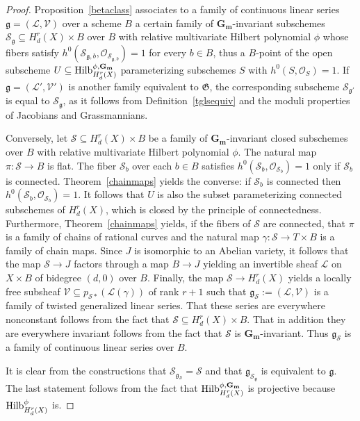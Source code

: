 \documentclass[a4paper,11pt]{amsart}
\theoremstyle{plain}
\theoremstyle{definition}
\theoremstyle{remark}
\def\cc{{\mathbf G}_{\mathbf m}}
\def\L{\mathcal{L}}
\def\V{\mathcal{V}}
\def\:{\colon}
\begin{document}
\begin{proof} Proposition~\ref{betaclass} associates to a family of continuous linear series $\mathfrak g=(\L,\V)$ over a scheme $B$ a certain family of $\cc$-invariant subschemes $\mathcal S_{\mathfrak g}\subseteq H^r_d(X)\times B$ over $B$ with relative multivariate Hilbert polynomial $\phi$ 
whose fibers satisfy $h^0(\mathcal S_{\mathfrak g,b},\mathcal O_{\mathcal S_{\mathfrak g,b}})=1$ for every $b\in B$, thus a 
$B$-point of the open subscheme $U\subseteq\text{\rm Hilb}_{H_d^r(X)}^{\phi,\cc}$ parameterizing subschemes $S$ with $h^0(S,\mathcal O_S)=1$. If $\mathfrak g=(\L',\V')$ is another family equivalent to $\mathfrak G$, the corresponding subscheme $\mathcal S_{\mathfrak g'}$ is equal to $\mathcal S_{\mathfrak g}$, as it follows from Definition~\ref{tglsequiv} and the moduli properties of Jacobians and Grassmannians. 

Conversely, let $\mathcal S\subseteq H_d^r(X)\times B$ be a family of 
$\cc$-invariant closed subschemes over $B$ with relative multivariate Hilbert polynomial $\phi$. The natural map $\pi\colon\mathcal S\to B$ is flat. The fiber $\mathcal S_b$ over each $b\in B$ satisfies $h^0(\mathcal S_b,\mathcal O_{\mathcal S_b})=1$ only if $\mathcal S_b$ is connected. Theorem~\ref{chainmaps} yields the converse: if $\mathcal S_b$ is connected then $h^0(\mathcal S_b,\mathcal O_{\mathcal S_b})=1$. It follows that 
$U$ is also the subset parameterizing connected subschemes of $H_d^r(X)$, which is closed by the principle of connectedness. Furthermore, Theorem~\ref{chainmaps} yields, if the fibers of 
$\mathcal S$ are connected, that $\pi$ is a family of chains of rational curves and the natural map 
$\gamma\:\mathcal S\to T\times B$ is a family of chain maps. Since 
$J$ is isomorphic to an Abelian variety, it follows that the map $\mathcal S\to J$ factors through a map $B\to J$ yielding an invertible sheaf $\mathcal L$ on $X\times B$ of bidegree $(d,0)$ over $B$. Finally, the map $\mathcal S\to H^r_d(X)$ yields a locally free subsheaf 
$\V\subseteq p_{\mathcal S*}(\mathcal L(\gamma))$ of rank $r+1$ such that $\mathfrak g_{\mathcal S}:=(\L,\V)$ is a family of twisted generalized linear series. That these series are everywhere nonconstant follows from the fact that $\mathcal S\subseteq H_d^r(X)\times B$. That in addition they are everywhere invariant follows from the fact that $\mathcal S$ is $\cc$-invariant. Thus $\mathfrak g_{\mathcal S}$ is a family of continuous linear series over $B$. 

It is clear from the constructions that $\mathcal S_{\mathfrak g_{\mathcal S}}=\mathcal S$ and that $\mathfrak g_{\mathcal S_{\mathfrak g}}$ is equivalent to $\mathfrak g$. The last statement follows from the fact that $\text{\rm Hilb}_{H_d^r(X)}^{\phi,\cc}$ is projective because $\text{\rm Hilb}_{H_d^r(X)}^{\phi}$ is.  
\end{proof}
\end{document}
